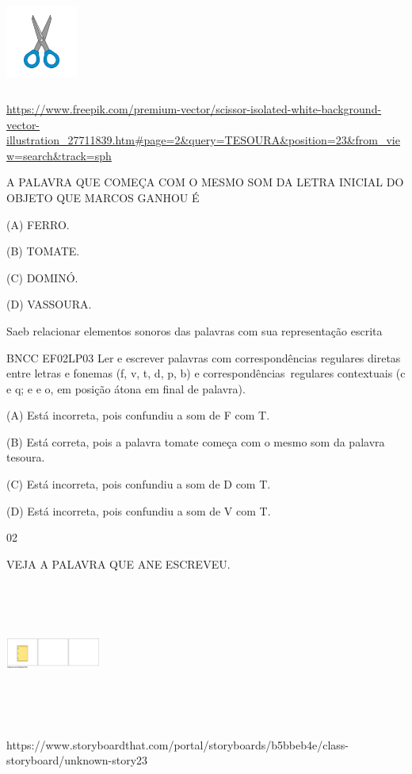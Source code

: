 {{{{{{\includegraphics[width=0.92708in,height=1.18125in]{media/image163.jpeg}

\url{https://www.freepik.com/premium-vector/scissor-isolated-white-background-vector-illustration_27711839.htm\#page=2\&query=TESOURA\&position=23\&from_view=search\&track=sph}

A PALAVRA QUE COMEÇA COM O MESMO SOM DA LETRA INICIAL DO OBJETO QUE
MARCOS GANHOU É

(A) FERRO.

(B) TOMATE.

(C) DOMINÓ.

(D) VASSOURA.

Saeb relacionar elementos sonoros das palavras com sua representação
escrita

BNCC EF02LP03 Ler e escrever palavras com correspondências regulares
diretas entre letras e fonemas (f, v, t, d, p, b) e
correspondências~regulares contextuais (c e q; e e o, em posição átona
em final de palavra).

(A) Está incorreta, pois confundiu a som de F com T.

(B) Está correta, pois a palavra tomate começa com o mesmo som da
palavra tesoura.

(C) Está incorreta, pois confundiu a som de D com T.

(D) Está incorreta, pois confundiu a som de V com T.

\num{02}

VEJA A PALAVRA QUE ANE ESCREVEU.

\includegraphics[width=1.22986in,height=1.82986in]{media/image164.png}

https://www.storyboardthat.com/portal/storyboards/b5bbeb4e/class-storyboard/unknown-story23

}}}}}}
